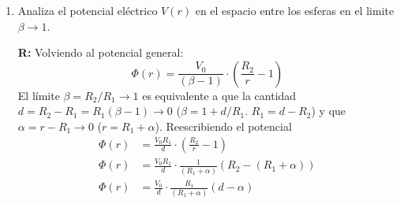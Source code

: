 \documentclass[]{article}
\numberwithin{equation}{section}
\newcommand{\0}{\textcolor{gray}{0}}
\newcommand{\rv}{\mathbf{r}}
\newcommand{\rhat}{\hat{\rv}}
\newcommand{\eo}{\epsilon_{0}}
\newcommand{\pd}[2]{\dfrac{\partial #1}{\partial #2}}
\begin{document}
\begin{enumerate}
	Para la primera integral podemos decir que el potencial en la superficie es 0, efectivamente anulando la integral. El potencial es, entonces:
	\begin{align*}
		\Phi(r) = \frac{V_0 }{\left(\beta - 1\right)} \cdot \left(\frac{R_2}{r} - 1\right)
	\end{align*}
	La densidad de carga superficial se obtiene mediante el salto del campo eléctrico (o la derivada normal del potencial) en la superficie:
	\begin{align*}
		(\mathbf{E}_2 - \mathbf{E}_1)\cdot\hat{\mathbf{n}} &= \frac{\sigma}{\eo}\\
		\Rightarrow \sigma &= \eo (\mathbf{E}_2 - 0)\cdot\rhat\\
		\sigma &= -\eo \left. \pd{\Phi}{r} \right|_{r=R_1}
	\end{align*}
	La derivada del potencial es:
	\begin{align*}
		\pd{\Phi}{r} &= \frac{V_0 }{\left(\beta - 1\right)} \cdot \pd{}{r}\left[\left(\frac{R_2}{r} - 1\right)\right]\\
		&= -\frac{V_0 }{\left(\beta - 1\right)} \cdot \frac{R_2}{r^2}
	\end{align*}
	Evaluando en \(r = R_1\)
	\begin{align*}
		\sigma &= \eo \frac{\beta}{\left(\beta - 1\right)} \cdot \frac{V_0}{R_1}
	\end{align*}
	
	\item Analiza el potencial eléctrico \( V (r) \) en el espacio entre los esferas en el limite \(\beta \rightarrow 1\).
	
	\textbf{R:} Volviendo al potencial general:
	\begin{equation*}
		\Phi(r) = \frac{V_0 }{\left(\beta - 1\right)} \cdot \left(\frac{R_2}{r} - 1\right)
	\end{equation*}
	El límite \(\beta = R_2/R_1 \rightarrow 1\) es equivalente a que la cantidad \(d = R_2 - R_1 = R_1(\beta - 1) \rightarrow 0\) (\(\beta = 1 + d/R_1\). \(R_1 = d - R_2\)) y que \(\alpha = r - R_1 \rightarrow 0\) (\(r = R_1 + \alpha\)). Reescribiendo el potencial
	\begin{align*}
		\Phi(r) &= \frac{V_0 R_1}{d} \cdot \left(\frac{R_2}{r} - 1\right)\\
		\Phi(r) &= \frac{V_0 R_1}{d} \cdot \frac{1}{(R_1 + \alpha)}\left(R_2 - (R_1 + \alpha)\right)\\
		\Phi(r) &= \frac{V_0}{d} \cdot \frac{R_1}{(R_1 + \alpha)}\left(d - \alpha\right)\\
	\end{align*}
	
\end{enumerate}
	
\end{document}
